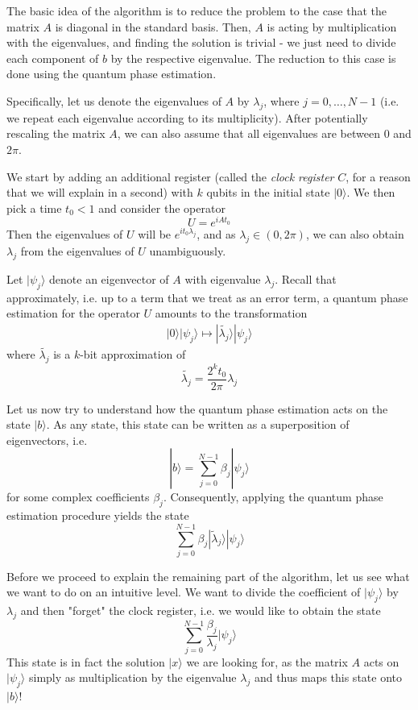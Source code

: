 \documentclass[a4paper, draft]{article}
\theoremstyle{own}
\theoremstyle{remark}
\begin{document}
The basic idea of the algorithm is to reduce the problem to the case that the matrix $A$ is diagonal in the standard basis. Then, $A$ is acting by multiplication with the eigenvalues, and finding the solution is trivial - we just need to divide each component of $b$ by the respective eigenvalue. The reduction to this case is done using the quantum phase estimation.

Specifically, let us denote the eigenvalues of $A$ by $\lambda_j$, where $j = 0, \dots, N-1$ (i.e. we repeat each eigenvalue according to its multiplicity). After potentially rescaling the matrix $A$, we can also assume that all eigenvalues are between $0$ and $2 \pi$. 

We start by adding an additional register (called the \emph{clock register} $C$, for a reason that we will explain in a second) with $k$ qubits in the initial state $|0 \rangle$. We then pick a time $t_0 < 1$ and consider the operator
$$
U = e^{ i A t_0}
$$
Then the eigenvalues of $U$ will be $e^{i t_0 \lambda_j }$, and as $\lambda_j \in (0, 2\pi)$, we can also obtain $\lambda_j$ from the eigenvalues of $U$ unambiguously.

Let $|\psi_j \rangle$ denote an eigenvector of $A$ with eigenvalue $\lambda_j$. Recall that approximately, i.e. up to a term that we treat as an error term, a quantum phase estimation for the operator $U$ amounts to the transformation
\begin{align}\label{eq:qpetransformation}
|0 \rangle |\psi_j \rangle \mapsto |\tilde{\lambda_j} \rangle  |\psi_j \rangle
\end{align}
where $\tilde{\lambda_j}$ is a $k$-bit approximation of 
$$
\tilde{\lambda_j} = \frac{2^k t_0}{2\pi} \lambda_j
$$

Let us now try to understand how the quantum phase estimation acts on the state $|b \rangle$. As any state, this state can be written as a superposition of eigenvectors, i.e.
$$
|b \rangle = \sum_{j=0}^{N-1} \beta_j |\psi_j \rangle
$$
for some complex coefficients $\beta_j$. Consequently, applying the quantum phase estimation procedure yields the state
$$
\sum_{j=0}^{N-1} \beta_j |\tilde{\lambda}_j \rangle |\psi_j \rangle
$$

Before we proceed to explain the remaining part of the algorithm, let us see what we want to do on an intuitive level. We want to divide the coefficient of $|\psi_j \rangle$ by $\lambda_j$ and then "forget" the clock register, i.e. we would like to obtain the state
$$
\sum_{j=0}^{N-1} \frac{\beta_j}{\lambda_j}  |\psi_j \rangle
$$
This state is in fact the solution $|x \rangle$ we are looking for, as the matrix $A$ acts on $|\psi_j \rangle$ simply as multiplication by the eigenvalue $\lambda_j$ and thus maps this state onto $|b \rangle$!
\end{document}
